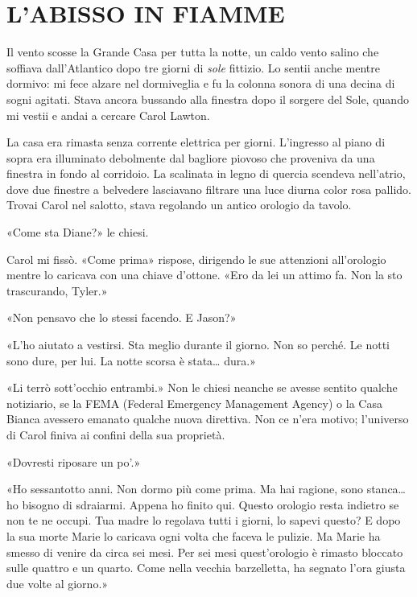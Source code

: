 \chapter{L'ABISSO IN FIAMME}\label{l-abisso-di-fiamme}

\hfill\break

Il vento scosse la Grande Casa per tutta la notte, un caldo vento salino
che soffiava dall'Atlantico dopo tre giorni di \emph{sole} fittizio. Lo
sentii anche mentre dormivo: mi fece alzare nel dormiveglia e fu la
colonna sonora di una decina di sogni agitati. Stava ancora bussando
alla finestra dopo il sorgere del Sole, quando mi vestii e andai a
cercare Carol Lawton.

La casa era rimasta senza corrente elettrica per giorni. L'ingresso al
piano di sopra era illuminato debolmente dal bagliore piovoso che
proveniva da una finestra in fondo al corridoio. La scalinata in legno
di quercia scendeva nell'atrio, dove due finestre a belvedere lasciavano
filtrare una luce diurna color rosa pallido. Trovai Carol nel salotto,
stava regolando un antico orologio da tavolo.

«Come sta Diane?» le chiesi.

Carol mi fissò. «Come prima» rispose, dirigendo le sue attenzioni
all'orologio mentre lo caricava con una chiave d'ottone. «Ero da lei un
attimo fa. Non la sto trascurando, Tyler.»

«Non pensavo che lo stessi facendo. E Jason?»

«L'ho aiutato a vestirsi. Sta meglio durante il giorno. Non so perché.
Le notti sono dure, per lui. La notte scorsa è stata\ldots{} dura.»

«Li terrò sott'occhio entrambi.» Non le chiesi neanche se avesse sentito
qualche notiziario, se la FEMA (Federal Emergency Management Agency) o
la Casa Bianca avessero emanato qualche nuova direttiva. Non ce n'era
motivo; l'universo di Carol finiva ai confini della sua proprietà.

«Dovresti riposare un po'.»

«Ho sessantotto anni. Non dormo più come prima. Ma hai ragione, sono
stanca\ldots{} ho bisogno di sdraiarmi. Appena ho finito qui. Questo
orologio resta indietro se non te ne occupi. Tua madre lo regolava tutti
i giorni, lo sapevi questo? E dopo la sua morte Marie lo caricava ogni
volta che faceva le pulizie. Ma Marie ha smesso di venire da circa sei
mesi. Per sei mesi quest'orologio è rimasto bloccato sulle quattro e un
quarto. Come nella vecchia barzelletta, ha segnato l'ora giusta due
volte al giorno.»

